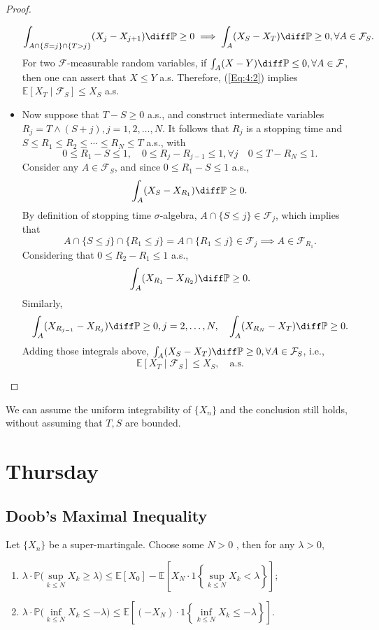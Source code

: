 \begin{proof}
\begin{itemize}
\begin{equation}
\int_{A\cap\{S=j\}\cap\{T>j\}}(X_{j}-X_{j+1})\diff\mathbb{P}\ge0\implies
\int_A(X_S-X_T)\diff\mathbb{P}\ge0,\forall A\in\mathcal{F}_S.
\end{equation}
For two $\mathcal{F}$-measurable random variables, if $\int_A(X-Y)\diff\mathbb{P}\le0, \forall A\in\mathcal{F}$, then one can assert that $X\le Y$ a.s. Therefore, (\ref{Eq:4:2}) implies 
$\mathbb{E}[X_T\mid\mathcal{F}_S]\le X_S$ a.s.
\item
Now suppose that $T-S\ge0$ a.s., and construct intermediate variables $R_j=T\land(S+j), j=1,2,\ldots,N$.
It follows that $R_j$ is a stopping time and $S\le R_1\le R_2\le\cdots\le R_N\le T$ a.s., with
\[
0\le R_1-S\le 1,\quad 0\le R_j-R_{j-1}\le 1,\forall j\quad 0\le T-R_N\le 1.
\]
Consider any $A\in\mathcal{F}_S$, and since $0\le R_1-S\le 1$ a.s.,
\[
\int_A(X_{S} - X_{R_1})\diff\mathbb{P}\ge0.
\]
By definition of stopping time $\sigma$-algebra, $A\cap\{S\le j\}\in\mathcal{F}_j$, which implies that
\[
A\cap\{S\le j\}\cap\{R_1\le j\}=A\cap\{R_1\le j\}\in\mathcal{F}_j\implies A\in\mathcal{F}_{R_1}.
\]
Considering that $0\le R_2-R_1\le 1$ a.s., 
\[
\int_A(X_{R_1} - X_{R_2})\diff\mathbb{P}\ge0.
\]
Similarly,
\[
\int_A(X_{R_{j-1}} - X_{R_j})\diff\mathbb{P}\ge0, j=2,\ldots,N,\quad
\int_A(X_{R_{N}} - X_{T})\diff\mathbb{P}\ge0.
\]
Adding those integrals above, $\int_A(X_S-X_T)\diff\mathbb{P}\ge0,\forall A\in\mathcal{F}_S$, i.e., 
\[
\mathbb{E}[X_T\mid\mathcal{F}_S]\le X_S,\quad\text{a.s.}
\]
\end{itemize}
\end{proof}


\begin{remark}
We can assume the uniform integrability of $\{X_n\}$ and the conclusion still holds, without assuming that $T,S$ are bounded.
\end{remark}

\section{Thursday}
\subsection{Doob's Maximal Inequality}

\begin{theorem}\label{The:max:in}
Let $\{X_n\}$ be a super-martingale. Choose some $N>0$ %
, then for any $\lambda>0$,
\begin{enumerate}
\item
$\lambda\cdot\mathbb{P}\bigg(
\sup\limits_{k\le N}X_k\ge\lambda
\bigg)\le \mathbb{E}[X_0] - \mathbb{E}\left[X_N\cdot 1\left\{\sup\limits_{k\le N}X_k<\lambda\right\}\right]$;
\item
$\lambda\cdot\mathbb{P}\bigg(
\inf\limits_{k\le N}X_k\le-\lambda
\bigg)\le \mathbb{E}\left[(-X_N)\cdot 1\left\{\inf\limits_{k\le N}X_k\le-\lambda\right\}\right]$.
\end{enumerate}
\end{theorem}

